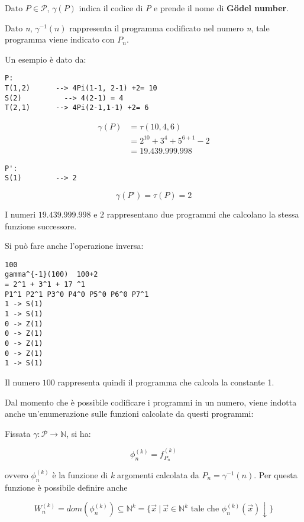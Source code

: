 Dato $ P \in \mathcal{P} $, $ \gamma(P) $ indica il codice di \textit{P} e prende il nome di \textbf{G\"odel number}.

Dato \textit{n}, $ \gamma^{-1}(n) $ rappresenta il programma codificato nel numero \textit{n}, tale programma viene indicato con $ P_n $.

Un esempio è dato da:
\begin{lstlisting}[language=URM]
P:
T(1,2) 		--> 4Pi(1-1, 2-1) +2= 10
S(2)		  --> 4(2-1) = 4
T(2,1)   	--> 4Pi(2-1,1-1) +2= 6
\end{lstlisting}

\begin{align*}
\gamma(P) &= \tau(10,4,6)\\
&= 2^10 + 3^4 + 5^{6+1} -2\\
&= 19.439.999.998
\end{align*}

\begin{lstlisting}[language=URM]
P':
S(1)		--> 2
\end{lstlisting}

$$
\gamma(P’) = \tau(P) = 2
$$

I numeri $ 19.439.999.998 $ e $ 2 $ rappresentano due programmi che calcolano la stessa funzione successore.

Si può fare anche l'operazione inversa:

\begin{verbatim}
100
gamma^{-1}(100)  100+2
= 2^1 + 3^1 + 17 ^1
P1^1 P2^1 P3^0 P4^0 P5^0 P6^0 P7^1
1 -> S(1)
1 -> S(1)
0 -> Z(1)
0 -> Z(1)
0 -> Z(1)
0 -> Z(1)
1 -> S(1)
\end{verbatim}

Il numero $ 100 $ rappresenta quindi il programma che calcola la constante 1.

Dal momento che è possibile codificare i programmi in un numero, viene indotta anche un'enumerazione sulle funzioni calcolate da questi programmi:

Fissata $ \gamma : \mathcal{P} \rightarrow \mathbb{N} $, si ha:

$$
\phi_{n}^{(k)} = f_{P_n}^{(k)}
$$

ovvero $ \phi_{n}^{(k)} $ è la funzione di \textit{k} argomenti calcolata da $ P_n = \gamma^{-1}(n) $.
Per questa funzione è possibile definire anche 

$$
W_{n}^{(k)} = dom(\phi_{n}^{(k)}) \subseteq \mathbb{N}^k = \{\vec{x}\: | \: \vec{x} \in \mathbb{N}^k \text{ tale che } \phi_{n}^{(k)}(\vec{x}) \downarrow\}
$$

